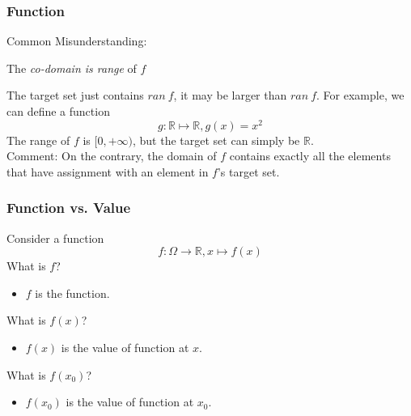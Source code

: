 \documentclass{beamer}
\begin{document}
\begin{frame}
    \frametitle{Function}
Common Misunderstanding:\\
\begin{center}
    The \emph{co-domain is range} of $f$
\end{center}
\hspace{1em} The target set just contains $ran\ f$, it may be larger than $ran\ f$. For example, we can define a function 
\begin{equation*}
    g: \mathbb{R}\longmapsto \mathbb{R}, g(x)=x^2
\end{equation*}
\hspace{1em} The range of $f$ is $[0,+\infty)$, but the target set can simply be $\mathbb{R}$.\\
\vspace{3em}
Comment: On the contrary, the domain of $f$ contains exactly all the elements that have assignment with an element in 
$f$'s target set.
\end{frame}
\begin{frame}
    \frametitle{Function vs. Value}
    \vspace{1em}
    Consider a function 
    $$f : \Omega \rightarrow \mathbb{R}, x \mapsto f(x) $$
    What is $f$?
    \begin{itemize}
        \item $f$ is the function.
    \end{itemize}
    What is $f(x)$?
    \begin{itemize}
        \item $f(x)$ is the value of function at $x$.
    \end{itemize}
    What is $f(x_0)$?
    \begin{itemize}
        \item $f(x_0)$ is the value of function at $x_0$.
    \end{itemize}
\end{frame}
\end{document}
